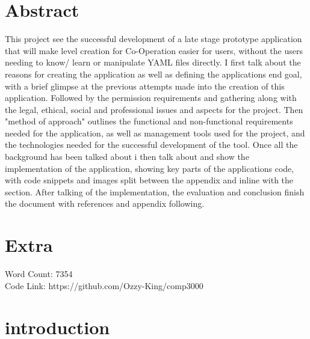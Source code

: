 \section*{Abstract}
This project see the successful development of a late stage prototype application that will make level creation for Co-Operation easier for users, without the users needing to know/ learn or manipulate YAML files directly. I first talk about the reasons for creating the application as well as defining the applications end goal, with a brief glimpse at the previous attempts made into the creation of this application. Followed by the permission requirements and gathering along with the legal, ethical, social and professional issues and aspects for the project. Then "method of approach" outlines the functional and non-functional requirements needed for the application, as well as management tools used for the project, and the technologies needed for the successful development of the tool. Once all the background has been talked about i then talk about and show the implementation of the application, showing key parts of the applications code, with code snippets and images split between the appendix and inline with the section. After talking of the implementation, the evaluation and conclusion finish the document with references and appendix following.

\section*{Extra}
Word Count: 7354\\
Code Link: https://github.com/Ozzy-King/comp3000

\clearpage
{}
\tableofcontents
\clearpage
{}
\listoffigures
{}
\lstlistoflistings
\clearpage


\section{introduction}
